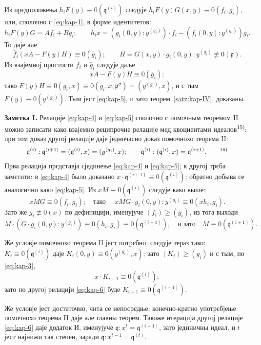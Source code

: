 \documentclass[11pt]{article}
\theoremstyle{plain}
\begin{document}
Из прєдположења $h_{i}F(y) \equiv 0(\mathfrak{q}^{(i)})$
слєдује
$h_{i}F(y)G(x,y) \equiv 0(f_{i}, g_{i})$, или, сполочно
с \eqref{eq:kap-1}, в формє идентитетов:
\[
h_{i}F(y)G = Af_{i} + Bg_{i}; \qquad
h_{i}x = (g_{i}(0,y):y^{(g_{i})})\cdot f_{i}
- (f_{i}(0,y):y^{(g_{i})})g_{i}.
\]
То даје але
\[
\bar{f}_{i}(xA - F(y)H) \equiv 0(\bar{g}_{i}); \qquad
H = G(x,y) \cdot g_{i}(0,y) : y^{(g_{i})} \not\equiv 0(\mathfrak{p}).
\]
Из взајемној простости $\bar{f}_{i}$ и $\bar{g}_{i}$ слєдује даље
\[
xA - F(y)H \equiv 0(\bar{g}_{i});
\]
тако $F(y)H \equiv 0(\bar{g}_{i}, x)
\equiv 0(\bar{g}_{i}, x, \mathfrak{p}^{\sigma})
= (y^{(g_{i})}, x)$, и с тым $F(y) \equiv 0(y^{(g_{i})})$.
Тым јест \eqref{eq:kap-5}, и зато теорем~\ref{satz:kap-IV}, доказаны.

\smallskip
\textbf{Замєтка I.} Релације \eqref{eq:kap-4} и \eqref{eq:kap-5}
сполочно с помочным теоремом II можно записати како взајемно
реципрочне релације мед квоциентами идеалов\textsuperscript{15)};
при том доказ другој релације даје једночасно доказ помочнохо
теорема II:
\begin{equation}\label{eq:kap-6}
\mathfrak{q}^{(i)} : \mathfrak{q}^{(i+1)}
= (\mathfrak{q}^{(i)}, x) = (y^{(g_{i})}, x); \qquad
\mathfrak{q}^{(i)} : (\mathfrak{q}^{(i)}, x)
= \mathfrak{q}^{(i+1)}.\qquad\text{\textsuperscript{16)}}
\end{equation}
Прва релација прєдставја сјединење \eqref{eq:kap-4} и
\eqref{eq:kap-5}; к другој трєба замєтити: в \eqref{eq:kap-4}
было доказано
$x \cdot \mathfrak{q}^{(i+1)} \equiv 0(\mathfrak{q}^{(i)})$;
обратно добыва се аналогично како \eqref{eq:kap-5}. Из
$xM \equiv 0(\mathfrak{q}^{(i)})$ слєдује како выше:
\[
xMG \equiv 0(f_{i}, g_{i}); \quad \text{тако }\quad
xMG \cdot g_{i}(0,y) : y^{(g_{i})}
\equiv 0(xh_{i}, g_{i}).
\]
Зато же $g_{i} \not\equiv 0(x)$ по дефиницији, именујуче
$(f_{i}) \geq (g_{i})$, из тога выходи
\[
M \cdot (G \cdot g_{i}(0,y) : y^{(g_{i})})
\equiv 0(h_{i}, g_{i}) \equiv 0(\mathfrak{q}^{(i+1)}),
\quad\text{и зато}\quad M \equiv 0(\mathfrak{q}^{(i+1)}).
\]

Же условје помочнохо теорема II јест потрєбно, слєдује тераз тако:
$K_{i} \equiv 0(\mathfrak{q}^{(i)})$ даје
$K_{i}(0,y) \equiv 0(y^{(g_{i})}, x)$; зато
$(K_{i}) \geq (g_{i})$ и с тым, по \eqref{eq:kap-3},
\[
x \cdot K_{i+1} \equiv 0(\mathfrak{q}^{(i)});
\]
зато по другој релацији \eqref{eq:kap-6} буде
$K_{i+1} \equiv 0(\mathfrak{q}^{(i+1)})$.

Же условје јест достаточно, чита се непосрєдње; конечно-кратно
употрєбјење помочнохо теорема II даје але главны теорем. Такоже
итерација другој релације \eqref{eq:kap-6} даје додаток И, именујуче
$\mathfrak{q} : x^{t} = \mathfrak{q}^{(t+1)}$, зато јединичны
идеал, и $t$ јест најнижи так степен, заради
$\mathfrak{q} : x^{t-1} = \mathfrak{q}^{(t)}$.
\end{document}
